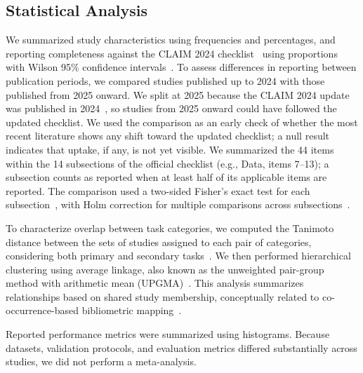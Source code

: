 \subsection{Statistical Analysis}
\label{sec:stats-methods}
We summarized study characteristics using frequencies and percentages, and reporting completeness against the CLAIM 2024 checklist~\cite{Tejani2024} using proportions with Wilson 95\% confidence intervals~\cite{wilson1927probable}. To assess differences in reporting between publication periods, we compared studies published up to 2024 with those published from 2025 onward. We split at 2025 because the CLAIM 2024 update was published in 2024~\cite{Tejani2024}, so studies from 2025 onward could have followed the updated checklist. We used the comparison as an early check of whether the most recent literature shows any shift toward the updated checklist; a null result indicates that uptake, if any, is not yet visible. We summarized the 44 items within the 14 subsections of the official checklist (e.g., Data, items 7--13); a subsection counts as reported when at least half of its applicable items are reported. The comparison used a two-sided Fisher's exact test for each subsection~\cite{fisher1922interpretation}, with Holm correction for multiple comparisons across subsections~\cite{holm1979simple}.

To characterize overlap between task categories, we computed the Tanimoto distance between the sets of studies assigned to each pair of categories, considering both primary and secondary tasks~\cite{rogers1960tanimoto}. We then performed hierarchical clustering using average linkage, also known as the unweighted pair-group method with arithmetic mean (UPGMA)~\cite{sokal1958statistical}. This analysis summarizes relationships based on shared study membership, conceptually related to co-occurrence-based bibliometric mapping~\cite{vaneck2010software}.

Reported performance metrics were summarized using histograms. Because datasets, validation protocols, and evaluation metrics differed substantially across studies, we did not perform a meta-analysis. 

